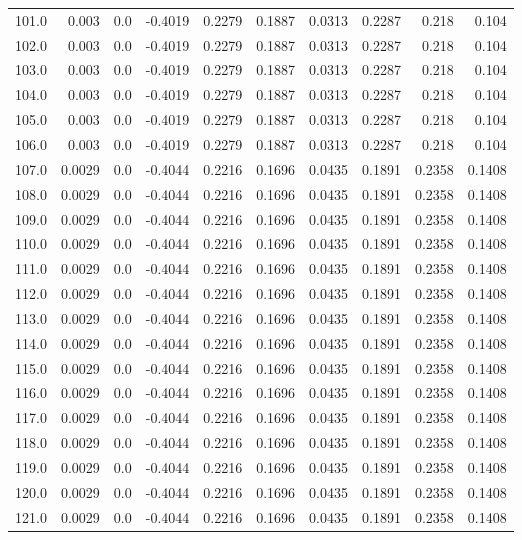 \begin{longtable}{lrrrrrrrrr}
101.0 & 0.003 & 0.0 & -0.4019 & 0.2279 & 0.1887 & 0.0313 & 0.2287 & 0.218 & 0.104 \\
102.0 & 0.003 & 0.0 & -0.4019 & 0.2279 & 0.1887 & 0.0313 & 0.2287 & 0.218 & 0.104 \\
103.0 & 0.003 & 0.0 & -0.4019 & 0.2279 & 0.1887 & 0.0313 & 0.2287 & 0.218 & 0.104 \\
104.0 & 0.003 & 0.0 & -0.4019 & 0.2279 & 0.1887 & 0.0313 & 0.2287 & 0.218 & 0.104 \\
105.0 & 0.003 & 0.0 & -0.4019 & 0.2279 & 0.1887 & 0.0313 & 0.2287 & 0.218 & 0.104 \\
106.0 & 0.003 & 0.0 & -0.4019 & 0.2279 & 0.1887 & 0.0313 & 0.2287 & 0.218 & 0.104 \\
107.0 & 0.0029 & 0.0 & -0.4044 & 0.2216 & 0.1696 & 0.0435 & 0.1891 & 0.2358 & 0.1408 \\
108.0 & 0.0029 & 0.0 & -0.4044 & 0.2216 & 0.1696 & 0.0435 & 0.1891 & 0.2358 & 0.1408 \\
109.0 & 0.0029 & 0.0 & -0.4044 & 0.2216 & 0.1696 & 0.0435 & 0.1891 & 0.2358 & 0.1408 \\
110.0 & 0.0029 & 0.0 & -0.4044 & 0.2216 & 0.1696 & 0.0435 & 0.1891 & 0.2358 & 0.1408 \\
111.0 & 0.0029 & 0.0 & -0.4044 & 0.2216 & 0.1696 & 0.0435 & 0.1891 & 0.2358 & 0.1408 \\
112.0 & 0.0029 & 0.0 & -0.4044 & 0.2216 & 0.1696 & 0.0435 & 0.1891 & 0.2358 & 0.1408 \\
113.0 & 0.0029 & 0.0 & -0.4044 & 0.2216 & 0.1696 & 0.0435 & 0.1891 & 0.2358 & 0.1408 \\
114.0 & 0.0029 & 0.0 & -0.4044 & 0.2216 & 0.1696 & 0.0435 & 0.1891 & 0.2358 & 0.1408 \\
115.0 & 0.0029 & 0.0 & -0.4044 & 0.2216 & 0.1696 & 0.0435 & 0.1891 & 0.2358 & 0.1408 \\
116.0 & 0.0029 & 0.0 & -0.4044 & 0.2216 & 0.1696 & 0.0435 & 0.1891 & 0.2358 & 0.1408 \\
117.0 & 0.0029 & 0.0 & -0.4044 & 0.2216 & 0.1696 & 0.0435 & 0.1891 & 0.2358 & 0.1408 \\
118.0 & 0.0029 & 0.0 & -0.4044 & 0.2216 & 0.1696 & 0.0435 & 0.1891 & 0.2358 & 0.1408 \\
119.0 & 0.0029 & 0.0 & -0.4044 & 0.2216 & 0.1696 & 0.0435 & 0.1891 & 0.2358 & 0.1408 \\
120.0 & 0.0029 & 0.0 & -0.4044 & 0.2216 & 0.1696 & 0.0435 & 0.1891 & 0.2358 & 0.1408 \\
121.0 & 0.0029 & 0.0 & -0.4044 & 0.2216 & 0.1696 & 0.0435 & 0.1891 & 0.2358 & 0.1408 \\

\end{longtable}
